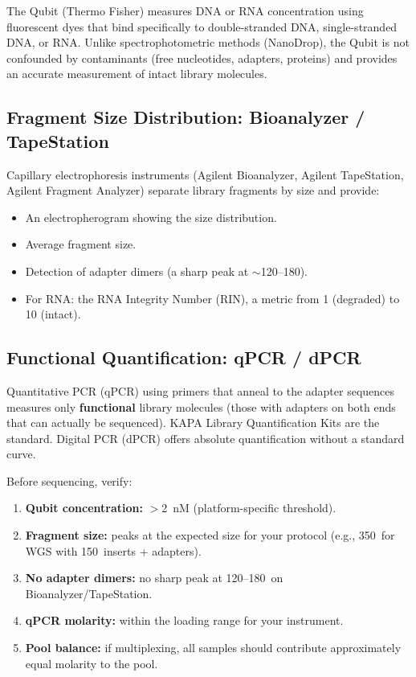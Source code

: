 The Qubit (Thermo Fisher) measures DNA or RNA concentration using fluorescent dyes that bind specifically to double-stranded DNA, single-stranded DNA, or RNA. Unlike spectrophotometric methods (NanoDrop), the Qubit is not confounded by contaminants (free nucleotides, adapters, proteins) and provides an accurate measurement of intact library molecules.

\subsection{Fragment Size Distribution: Bioanalyzer / TapeStation}

Capillary electrophoresis instruments (Agilent Bioanalyzer, Agilent TapeStation, Agilent Fragment Analyzer) separate library fragments by size and provide:

\begin{itemize}[nosep]
  \item An electropherogram showing the size distribution.
  \item Average fragment size.
  \item Detection of adapter dimers (a sharp peak at ${\sim}$120--180\basepair).
  \item For RNA: the RNA Integrity Number (RIN), a metric from 1 (degraded) to 10 (intact).
\end{itemize}

\subsection{Functional Quantification: qPCR / dPCR}

Quantitative PCR (qPCR) using primers that anneal to the adapter sequences measures only \textbf{functional} library molecules (those with adapters on both ends that can actually be sequenced). KAPA Library Quantification Kits are the standard. Digital PCR (dPCR) offers absolute quantification without a standard curve.

\begin{protocolbox}[title={Library QC Checklist}]
Before sequencing, verify:
\begin{enumerate}[nosep]
  \item \textbf{Qubit concentration:} $>$2~nM (platform-specific threshold).
  \item \textbf{Fragment size:} peaks at the expected size for your protocol (e.g., 350\basepair\ for WGS with 150\basepair\ inserts + adapters).
  \item \textbf{No adapter dimers:} no sharp peak at 120--180\basepair\ on Bioanalyzer/TapeStation.
  \item \textbf{qPCR molarity:} within the loading range for your instrument.
  \item \textbf{Pool balance:} if multiplexing, all samples should contribute approximately equal molarity to the pool.
\end{enumerate}
\end{protocolbox}



